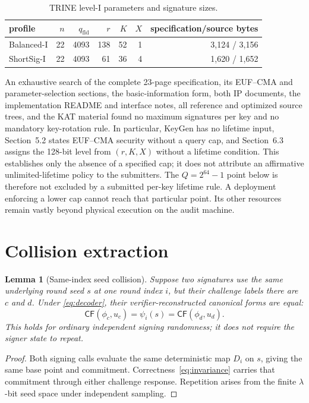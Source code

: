 \documentclass[11pt,a4paper]{article}
\newtheorem{lemma}[theorem]{Lemma}
\newcommand{\CF}{\mathsf{CF}}
\newcommand{\qfld}{q_{\mathrm{fld}}}
\begin{document}
\begin{table}[ht]
\centering
\caption{TRINE level-I parameters and signature sizes.}
\label{tab:params}
\begin{tabular}{lrrrrrr}
\toprule
profile & $n$ & $\qfld$ & $r$ & $K$ & $X$ & specification/source bytes\\
\midrule
Balanced-I & 22 & 4093 & 138 & 52 & 1 & 3,124 / 3,156\\
ShortSig-I & 22 & 4093 & 61 & 36 & 4 & 1,620 / 1,652\\
\bottomrule
\end{tabular}
\end{table}

An exhaustive search of the complete 23-page specification, its EUF--CMA and
parameter-selection sections, the basic-information form, both IP documents,
the implementation README and interface notes, all reference and optimized
source trees, and the KAT material found no maximum signatures per key and no
mandatory key-rotation rule.  In particular, KeyGen has no lifetime input,
Section~5.2 states EUF--CMA security without a query cap, and Section~6.3
assigns the 128-bit level from $(r,K,X)$ without a lifetime condition.  This
establishes only the absence of a specified cap; it does not attribute an
affirmative unlimited-lifetime policy to the submitters.  The
$Q=2^{64}-1$ point below is therefore not excluded by a submitted per-key
lifetime rule.  A deployment enforcing a lower cap cannot reach that
particular point.  Its
other resources remain vastly beyond physical execution on the audit machine.

\section{Collision extraction}

\begin{lemma}[Same-index seed collision]\label{lem:seedcollision}
Suppose two signatures use the same underlying round seed $s$ at one round
index $i$, but their challenge labels there are $c$ and $d$.  Under
\eqref{eq:decoder}, their verifier-reconstructed canonical forms are equal:
\[
             \CF(\phi_c,u_c)=\psi_i(s)=\CF(\phi_d,u_d).
\]
This holds for ordinary independent signing randomness; it does not require
the signer state to repeat.
\end{lemma}
\begin{proof}
Both signing calls evaluate the same deterministic map $D_i$ on $s$, giving
the same base point and commitment.  Correctness~\eqref{eq:invariance} carries
that commitment through either challenge response.  Repetition arises from
the finite $\lambda$-bit seed space under independent sampling.
\end{proof}
\end{document}

